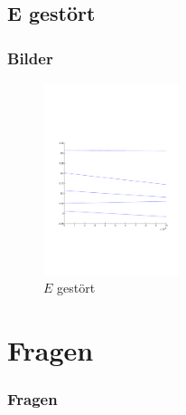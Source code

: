 \documentclass[aspectratio=169]{beamer}
\begin{document}
\subsection{ E gest\"ort }
\begin{frame}
  \frametitle{ Bilder }
  \begin{figure}
    \centering
    \includegraphics[height=5.6cm,clip=true,trim=2cm 7.5cm 1cm 8cm]{../../skript/efeld/Energie_gestoert.pdf}
    \caption{$E$ gest\"ort}
    \label{abb:efeld_E_gestoert}
  \end{figure}

\end{frame}




\section{ Fragen }
\begin{frame}
  \frametitle{ Fragen }
\end{frame}
\end{document}
